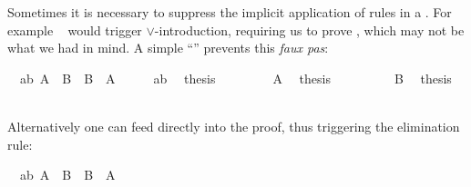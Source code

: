 \begin{isabellebody}
\begin{isamarkuptext}
Sometimes it is necessary to suppress the implicit application of rules in a
. For example ~
would trigger $\lor$-introduction, requiring us to prove , which may
not be what we had in mind.
A simple ``'' prevents this \emph{faux pas}:%
\end{isamarkuptext}%
\isamarkuptrue%
\isamarkupfalse%
\ \ ab{}\ {}A\ {}\ B{}\ \ {}B\ {}\ A{}\isanewline
%
\isadelimproof
%
\endisadelimproof
%
\isatagproof
{}\isamarkupfalse%
\ {}\isanewline
\ \ \isamarkupfalse%
\ ab\ \isamarkupfalse%
\ {}thesis\isanewline
\ \ \isamarkupfalse%
\isanewline
\ \ \ \ \isamarkupfalse%
\ A\ \isamarkupfalse%
\ {}thesis\ \isamarkupfalse%
\isanewline
\ \ \isamarkupfalse%
\isanewline
\ \ \ \ \isamarkupfalse%
\ B\ \isamarkupfalse%
\ {}thesis\ \isamarkupfalse%
\isanewline
\ \ \isamarkupfalse%
\isanewline
{}\isamarkupfalse%
%
\endisatagproof
{\isafoldproof}%
%
\isadelimproof
%
\endisadelimproof
%
\begin{isamarkuptext}%
\noindent Alternatively one can feed  directly
into the proof, thus triggering the elimination rule:%
\end{isamarkuptext}%
\isamarkuptrue%
\isamarkupfalse%
\ \ ab{}\ {}A\ {}\ B{}\ \ {}B\ {}\ A{}\isanewline
%
\isadelimproof
%
\endisadelimproof
%
\isatagproof

\end{isabellebody}
